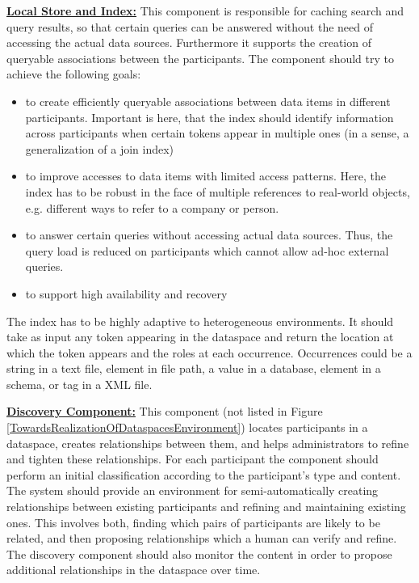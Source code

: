 \uline{\textbf{Local Store and Index:}} This component is responsible for caching search and query results, so that certain queries can be answered without the need of accessing the actual data sources. Furthermore it supports the creation of queryable associations between the participants. The component should try to achieve the following goals:
\begin{itemize}
\item to create efficiently queryable associations between data items in different participants. Important is here, that the index should identify information across participants when certain tokens appear in multiple ones (in a sense, a generalization of a join index)

\item to improve accesses to data items with limited access patterns. Here, the index has to be robust in the face of multiple references to real-world objects, e.g. different ways to refer to a company or person.

\item to answer certain queries without accessing actual data sources. Thus, the query load is reduced on participants which cannot allow ad-hoc external queries. 
  
\item to support high availability and recovery   
\end{itemize}

The index has to be highly adaptive to heterogeneous environments. It should take as input any token appearing in the dataspace and return the location at which the token appears and the roles at each occurrence. Occurrences could be a string in a text file, element in file path, a value in a database, element in a schema, or tag in a XML file. 

\uline{\textbf{Discovery Component:}} This component (not listed in Figure \ref{TowardsRealizationOfDataspacesEnvironment}) locates participants in a dataspace, creates relationships between them, and helps administrators to refine and tighten these relationships. For each participant the component should perform an initial classification according to the participant's type and content. The system should provide an environment for semi-automatically creating relationships between existing participants and refining and maintaining existing ones. This involves both, finding which pairs of participants are likely to be related, and then proposing relationships which a human can verify and refine. The discovery component should also monitor the content in order to propose additional relationships in the dataspace over time.  

